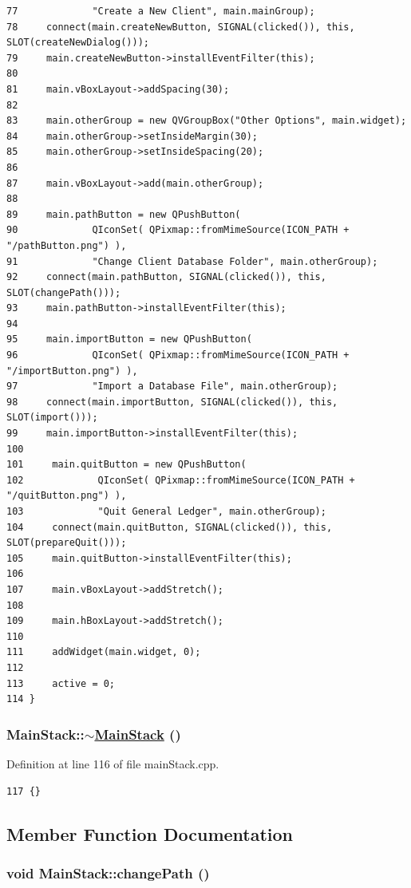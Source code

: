 \begin{verbatim}
77             "Create a New Client", main.mainGroup);
78     connect(main.createNewButton, SIGNAL(clicked()), this, SLOT(createNewDialog()));
79     main.createNewButton->installEventFilter(this);
80     
81     main.vBoxLayout->addSpacing(30);
82     
83     main.otherGroup = new QVGroupBox("Other Options", main.widget);
84     main.otherGroup->setInsideMargin(30);
85     main.otherGroup->setInsideSpacing(20);
86     
87     main.vBoxLayout->add(main.otherGroup);
88     
89     main.pathButton = new QPushButton(
90             QIconSet( QPixmap::fromMimeSource(ICON_PATH + "/pathButton.png") ),
91             "Change Client Database Folder", main.otherGroup);
92     connect(main.pathButton, SIGNAL(clicked()), this, SLOT(changePath()));
93     main.pathButton->installEventFilter(this);
94 
95     main.importButton = new QPushButton(
96             QIconSet( QPixmap::fromMimeSource(ICON_PATH + "/importButton.png") ),
97             "Import a Database File", main.otherGroup);
98     connect(main.importButton, SIGNAL(clicked()), this, SLOT(import()));
99     main.importButton->installEventFilter(this);
100     
101     main.quitButton = new QPushButton(
102             QIconSet( QPixmap::fromMimeSource(ICON_PATH + "/quitButton.png") ),
103             "Quit General Ledger", main.otherGroup);
104     connect(main.quitButton, SIGNAL(clicked()), this, SLOT(prepareQuit()));
105     main.quitButton->installEventFilter(this);
106     
107     main.vBoxLayout->addStretch();
108     
109     main.hBoxLayout->addStretch();
110     
111     addWidget(main.widget, 0);
112     
113     active = 0;
114 }
\end{verbatim}\normalsize 


\hypertarget{classMainStack_a1}{
\subsubsection[$\sim$MainStack]{\setlength{\rightskip}{0pt plus 5cm}Main\-Stack::$\sim$\hyperlink{classMainStack}{Main\-Stack} ()}}
\label{classMainStack_a1}


Definition at line 116 of file main\-Stack.cpp.

\footnotesize\begin{verbatim}117 {}
\end{verbatim}\normalsize 




\subsection{Member Function Documentation}
\hypertarget{classMainStack_k5}{
\subsubsection[changePath]{\setlength{\rightskip}{0pt plus 5cm}void Main\-Stack::change\-Path ()}}
\label{classMainStack_k5}


